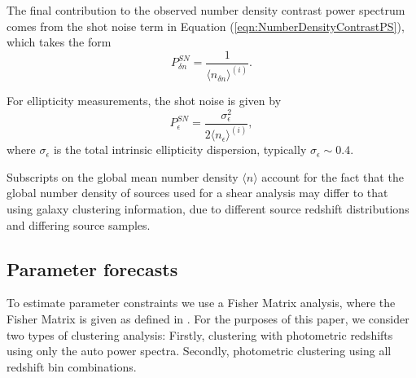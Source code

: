 \documentclass[useAMS,usenatbib,times,letter,amssymb]{mn2e}
\def\be{\begin{equation}}
\def\ee{\end{equation}}
\begin{document}
The final contribution to the observed number density contrast power spectrum comes from the shot noise term in Equation (\ref{eqn:NumberDensityContrastPS}), which takes the form
\be
P^{SN}_{\delta n} = \frac{1}{\langle n_{\delta n}\rangle^{(i)}}.
\ee

For ellipticity measurements, the shot noise is given by 
\be
P^{SN}_{\epsilon} = \frac{\sigma_\epsilon^2}{2\langle n_{\epsilon}\rangle^{(i)}},
\ee
where $\sigma_\epsilon$ is the total intrinsic ellipticity dispersion, typically $\sigma_\epsilon \sim 0.4$. 

Subscripts on the global mean number density $\langle n\rangle$ account for the fact that the global number density of sources used for a shear analysis may differ to that using galaxy clustering information, due to different source redshift distributions and differing source samples.

\subsection{Parameter forecasts}\label{Sec:ParameterForecasts}


To estimate parameter constraints we use a Fisher Matrix analysis, where the Fisher Matrix is given as defined in \cite{Tegmark:1997p9}. For the purposes of this paper, we consider two types of clustering analysis: Firstly, clustering with photometric redshifts using only the auto power spectra. Secondly, photometric clustering using all redshift bin combinations. 
\end{document}
